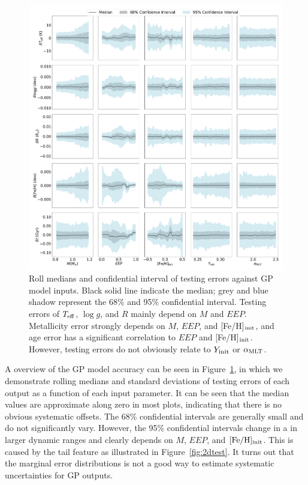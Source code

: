 \begin{figure}
	\includegraphics[width=2.0\columnwidth]{ 5d-testing_vs_inputs.pdf}
    \caption{ Roll medians and confidential interval of testing errors against GP model  inputs. Black solid line indicate the median; grey and blue shadow represent the 68\% and 95\% confidential interval. Testing errors of $T_{\rm eff}$, $\log g$, and $R$ mainly depend on $M$ and $EEP$. Metallicity error strongly depends on $M$, $EEP$, and [Fe/H]$_{\rm init}$, and age error has a significant correlation to $EEP$ and [Fe/H]$_{\rm init}$. However, testing errors do not obviously relate to $Y_{\rm init}$ or $\alpha_{\rm MLT}$. } 
  \label{fig:5d_test_vs_input}
\end{figure}


A overview of the GP model accuracy can be seen in Figure~\ref{fig:5d_test_vs_input}, in which we demonstrate rolling medians and standard deviations of testing errors of each output as a function of each input parameter.
%
It can be seen that the median values are approximate along zero in most plots, indicating that there is no obvious systematic offsets.
%
The 68\% confidential intervals are generally small and do not significantly vary. However, the 95\% confidential intervals change in a in larger dynamic ranges and clearly depends on $M$, $EEP$, and $\rm [Fe/H]_{init}$. This is caused by the tail feature as illustrated in Figure~\ref{fig:2dtest}. It turns out that the marginal error distributions is not a good way to estimate systematic uncertainties for GP outputs. 
%


